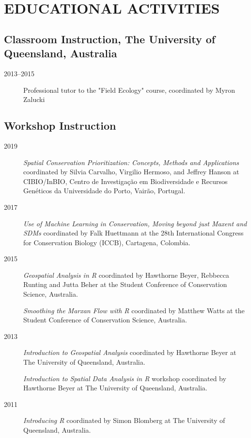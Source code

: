 \documentclass[12pt,a4paper]{article}
\begin{document}
\section*{EDUCATIONAL ACTIVITIES}

\subsection*{Classroom Instruction, The University of Queensland, Australia}
\begin{description}

\item[2013--2015] Professional tutor to the "Field Ecology" course, coordinated by Myron Zalucki

\end{description}

\subsection*{Workshop Instruction}
\begin{description}

\item[2019] \textit{Spatial Conservation Prioritization: Concepts, Methods and Applications} coordinated by Silvia Carvalho, Virgilio Hermoso, and Jeffrey Hanson at CIBIO/InBIO, Centro de Investigação em Biodiversidade e Recursos Genéticos da Universidade do Porto, Vairão, Portugal.

\item[2017] \textit{Use of Machine Learning in Conservation, Moving beyond just Maxent and SDMs} coordinated by Falk Huettmann at the 28th International Congress for Conservation Biology (ICCB), Cartagena, Colombia.

\item[2015] \textit{Geospatial Analysis in R} coordinated by Hawthorne Beyer, Rebbecca Runting and Jutta Beher at the Student Conference of Conservation Science, Australia.

\item[] \textit{Smoothing the Marxan Flow with R} coordinated by Matthew Watts at the Student Conference of Conservation Science, Australia.

\item[2013] \textit{Introduction to Geospatial Analysis} coordinated by Hawthorne Beyer at The University of Queensland, Australia.

\item[] \textit{Introduction to Spatial Data Analysis in R} workshop coordinated by Hawthorne Beyer at The University of Queensland, Australia.

\item[2011] \textit{Introducing R} coordinated by Simon Blomberg at The University of Queensland, Australia.

\end{description}
\end{document}
